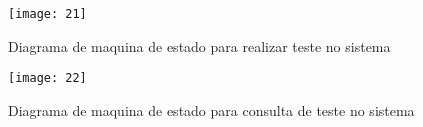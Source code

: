 \begin{figure}[h]
  \caption{Diagrama de maquina de estado para realizar teste no sistema}
  \centering
  \texttt{[image: 21]}
  \label{fig:21}
\end{figure}
\FloatBarrier

\begin{figure}[h]
  \caption{Diagrama de maquina de estado para consulta de teste no sistema}
  \centering
  \texttt{[image: 22]}
  \label{fig:22}
\end{figure}
\FloatBarrier
